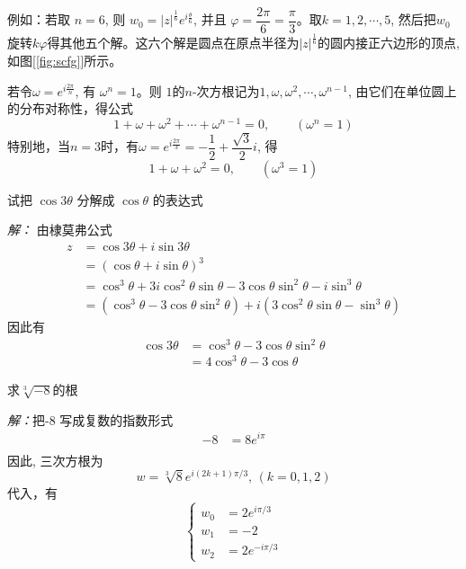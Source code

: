 例如：若取 $n=6$, 则 $ w_0 =  \left\vert z\right\vert ^{\frac{1}{6}} e^{i\frac{\theta}{6}}$, 并且 $\varphi = \dfrac{2  \pi}{6} = \dfrac{\pi}{3}$。取$k=1,2,\cdots ,5$, 然后把$ w_0 $旋转$ k \varphi $得其他五个解。这六个解是圆点在原点半径为$\left\vert z\right\vert ^{\frac{1}{6}} $的圆内接正六边形的顶点, 如图[\ref{fig:scfg}]所示。
    
若令$\omega = e^{i \frac{2 \pi}{n}}$, 有  $\omega^n =1$。则 $1$的$n$-次方根记为$1, \omega, \omega^2, \cdots, \omega^{n-1}$, 由它们在单位圆上的分布对称性，得公式 
    \begin{equation}
        1 + \omega + \omega^2 + \cdots + \omega^{n-1} =0  , \qquad  (\omega^n =1) 
    \end{equation}
特别地，当$n=3$时，有$\omega = e^{i \frac{2 \pi}{3}}  = - \dfrac{1}{2} + \dfrac{\sqrt{3}}{2} i $, 得 
    \begin{equation}
        1 + \omega + \omega^2 =0, \qquad  (\omega^3 =1) 
    \end{equation}
\begin{example}
    试把 $\cos 3\theta$ 分解成 $\cos \theta$ 的表达式 
\end{example}
\emph{解： }由棣莫弗公式
\[ \begin{aligned}
 z &= \cos 3 \theta + i \sin  3 \theta \\
    &= (\cos \theta + i \sin  \theta)^3 \\ 
    &= \cos ^3 \theta  + 3 i \cos ^2 \theta \sin \theta - 3 \cos \theta \sin ^2 \theta - i \sin ^3 \theta \\ 
    &= (\cos ^3 \theta - 3 \cos \theta \sin ^2 \theta ) + i (3  \cos ^2 \theta \sin \theta - \sin ^3 \theta )
\end{aligned}\]
因此有
\[\begin{aligned}
  \cos 3 \theta &=  \cos ^3 \theta - 3 \cos \theta \sin ^2 \theta  \\ 
  &= 4 \cos ^3 \theta - 3 \cos \theta
\end{aligned}\]
\begin{example}
    求$ \sqrt[3]{-8}$的根 
\end{example}
\emph{解：}把-8 写成复数的指数形式
\[ \begin{aligned}
     -8 &= 8 e^{i \pi}  \\ 
\end{aligned}\]
因此, 三次方根为 \[ w = \sqrt[3]{8} e^{i (2k +1)\pi / 3}, \, (k = 0, 1, 2) \]
代入，有
\[ \left\{ \begin{array} {rl}
    w_0 &= 2 e^{i \pi / 3} \\
    w_1 &= -2 \\
    w_2 &= 2 e^{-i \pi / 3}
\end{array} \right.\]

